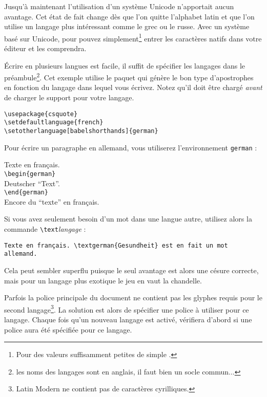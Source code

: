Jusqu'à maintenant l'utilisation d'un système  Unicode
n'apportait aucun avantage. Cet état de fait change dès que l'on
quitte l'alphabet latin et que l'on utilise un langage plus
intéressant comme le grec ou le russe. Avec un système basé sur
Unicode, pour pouvez simplement\footnote{Pour des valeurs suffisamment
  petites de \og simple \fg.} entrer les caractères natifs dans votre éditeur
et  les comprendra.

Écrire en plusieurs langues est facile, il suffit de spécifier les
langages dans le préambule\footnote{les noms des langages sont en
  anglais, il faut bien un socle commun... \NdT}. Cet exemple utilise
le paquet  qui génère le bon type d'apostrophes en
fonction du langage dans lequel vous écrivez. Notez qu'il doit être
chargé \emph{avant} de charger le support pour votre langage.

\begin{lscommand}
\verb|\usepackage{csquote}|\\
\verb|\setdefaultlanguage{french}|\\
\verb|\setotherlanguage[babelshorthands]{german}|
\end{lscommand}
%
Pour écrire un paragraphe en allemand, vous utiliserez l'environnement
\texttt{german} :

\begin{lscommand}
Texte en français.\\
\verb|\begin{german}|\\
Deutscher \enquote{Text}.\\
\verb|\end{german}|\\
Encore du \enquote{texte} en français.
\end{lscommand}

Si vous avez seulement besoin d'un mot dans une langue autre, utilisez
alors la commande \verb|\text|\emph{langage} :

\begin{lscommand}
\verb|Texte en français. \textgerman{Gesundheit} est en fait un mot allemand.|
\end{lscommand}

Cela peut sembler superflu puisque le seul avantage est alors une
césure correcte, mais pour un langage plus exotique le jeu en vaut la
chandelle.

Parfois la police principale du document ne contient pas les glyphes
requis pour le second langage\footnote{Latin Modern ne contient pas de
  caractères cyrilliques.}. La solution est alors de spécifier une
police à utiliser pour ce langage. Chaque fois qu'un nouveau langage
est activé,  vérifiera d'abord si une police aura été
spécifiée pour ce langage.

